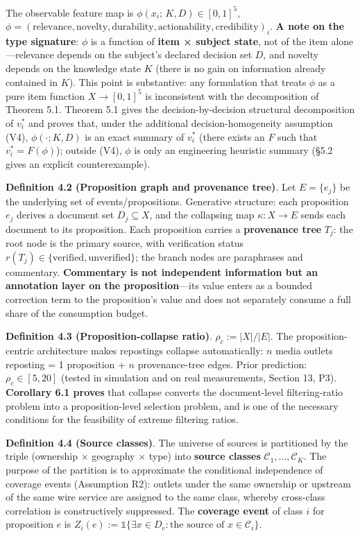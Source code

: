 \documentclass[
  11pt]{article}
\begin{document}
The observable feature map is \(\phi(x_i;\, K, D) \in [0,1]^5\),
\(\phi = (\text{relevance}, \text{novelty}, \text{durability}, \text{actionability}, \text{credibility})_i\).
\textbf{A note on the type signature}: \(\phi\) is a function of
\textbf{item × subject state}, not of the item alone---relevance depends
on the subject's declared decision set \(D\), and novelty depends on the
knowledge state \(K\) (there is no gain on information already contained
in \(K\)). This point is substantive: any formulation that treats
\(\phi\) as a pure item function \(X \to [0,1]^5\) is inconsistent with
the decomposition of Theorem 5.1. Theorem 5.1 gives the
decision-by-decision structural decomposition of \(v_i^*\) and proves
that, under the additional decision-homogeneity assumption (V4),
\(\phi(\cdot; K, D)\) is an exact summary of \(v_i^*\) (there exists an
\(F\) such that \(v_i^* = F(\phi)\)); outside (V4), \(\phi\) is only an
engineering heuristic summary (§5.2 gives an explicit counterexample).

\textbf{Definition 4.2 (Proposition graph and provenance tree)}. Let
\(E = \{e_j\}\) be the underlying set of events/propositions. Generative
structure: each proposition \(e_j\) derives a document set
\(D_j \subseteq X\), and the collapsing map \(\kappa: X \to E\) sends
each document to its proposition. Each proposition carries a
\textbf{provenance tree} \(T_j\): the root node is the primary source,
with verification status
\(r(T_j) \in \{\mathrm{verified}, \mathrm{unverified}\}\); the branch
nodes are paraphrases and commentary. \textbf{Commentary is not
independent information but an annotation layer on the
proposition}---its value enters as a bounded correction term to the
proposition's value and does not separately consume a full share of the
consumption budget.

\textbf{Definition 4.3 (Proposition-collapse ratio)}.
\(\rho_c := |X| / |E|\). The proposition-centric architecture makes
repostings collapse automatically: \(n\) media outlets reposting = 1
proposition + \(n\) provenance-tree edges. Prior prediction:
\(\rho_c \in [5, 20]\) (tested in simulation and on real measurements,
Section 13, P3). \textbf{Corollary 6.1 proves} that collapse converts
the document-level filtering-ratio problem into a proposition-level
selection problem, and is one of the necessary conditions for the
feasibility of extreme filtering ratios.

\textbf{Definition 4.4 (Source classes)}. The universe of sources is
partitioned by the triple (ownership × geography × type) into
\textbf{source classes} \(\mathcal{C}_1, \dots, \mathcal{C}_K\). The
purpose of the partition is to approximate the conditional independence
of coverage events (Assumption R2): outlets under the same ownership or
upstream of the same wire service are assigned to the same class,
whereby cross-class correlation is constructively suppressed. The
\textbf{coverage event} of class \(i\) for proposition \(e\) is
\(Z_i(e) := \mathbb{1}\{\exists x \in D_e: \text{the source of } x \in \mathcal{C}_i\}\).
\end{document}
